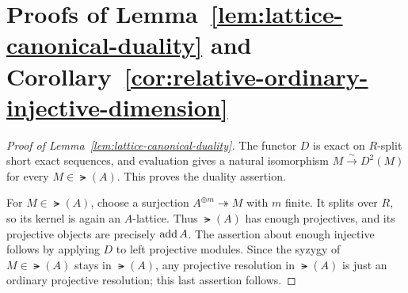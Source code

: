 \documentclass[a4paper,leqno]{amsart}
\begin{document}
\section{Proofs of Lemma~\ref{lem:lattice-canonical-duality} and Corollary~\ref{cor:relative-ordinary-injective-dimension}}
\label{app:lattice-proofs}
\begin{proof}[Proof of Lemma~\ref{lem:lattice-canonical-duality}]
The functor $D$ is exact on $R$-split short exact sequences, and evaluation gives a natural isomorphism $M\xrightarrow{\sim}D^2(M)$ for every $M\in\lat(A)$. This proves the duality assertion.

For $M\in\lat(A)$, choose a surjection $A^{\oplus m}\twoheadrightarrow M$ with $m$ finite. It splits over $R$, so its kernel is again an $A$-lattice. Thus $\lat(A)$ has enough projectives, and its projective objects are precisely $\operatorname{add} A$. The assertion about enough injective follows by applying $D$ to left projective modules.  Since the syzygy of $M\in \lat(A)$ stays in $\lat(A)$, any projective resolution in $\lat(A)$ is just an ordinary projective resolution; this last assertion follows.
\end{proof}
\end{document}
